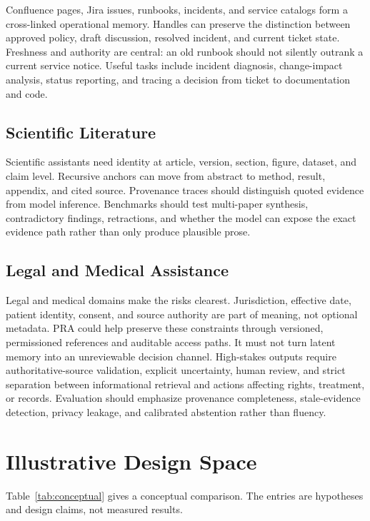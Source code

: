 \documentclass[11pt]{article}
\begin{document}
Confluence pages, Jira issues, runbooks, incidents, and service catalogs form a cross-linked operational memory. Handles can preserve the distinction between approved policy, draft discussion, resolved incident, and current ticket state. Freshness and authority are central: an old runbook should not silently outrank a current service notice. Useful tasks include incident diagnosis, change-impact analysis, status reporting, and tracing a decision from ticket to documentation and code.

\subsection{Scientific Literature}

Scientific assistants need identity at article, version, section, figure, dataset, and claim level. Recursive anchors can move from abstract to method, result, appendix, and cited source. Provenance traces should distinguish quoted evidence from model inference. Benchmarks should test multi-paper synthesis, contradictory findings, retractions, and whether the model can expose the exact evidence path rather than only produce plausible prose.

\subsection{Legal and Medical Assistance}

Legal and medical domains make the risks clearest. Jurisdiction, effective date, patient identity, consent, and source authority are part of meaning, not optional metadata. PRA could help preserve these constraints through versioned, permissioned references and auditable access paths. It must not turn latent memory into an unreviewable decision channel. High-stakes outputs require authoritative-source validation, explicit uncertainty, human review, and strict separation between informational retrieval and actions affecting rights, treatment, or records. Evaluation should emphasize provenance completeness, stale-evidence detection, privacy leakage, and calibrated abstention rather than fluency.

\section{Illustrative Design Space}

Table~\ref{tab:conceptual} gives a conceptual comparison. The entries are hypotheses and design claims, not measured results.
\end{document}
